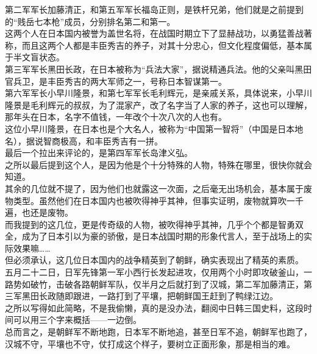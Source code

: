 \begin{multicols}{\theparacolNo}
第二军军长加藤清正，和第五军军长福岛正则，是铁杆兄弟，他们就是之前提到的“贱岳七本枪”成员，分别排名第二和第一。\\

这两个人在日本国内被誉为盖世名将，在战国时期立下了显赫战功，以勇猛善战著称，而且这两个人都是丰臣秀吉的养子，对其十分忠心，但文化程度偏低，基本属于半文盲状态。\\

第三军军长黑田长政，在日本被称为“兵法大家”，据说精通兵法。他的父亲叫黑田官兵卫，是丰臣秀吉的两大军师之一，号称日本智谋第一。\\

第六军军长小早川隆景，和第七军军长毛利辉元，是亲戚关系，具体说来，小早川隆景是毛利辉元的叔叔，为了混家产，改了名字当了人家的养子，这也可以理解，那年头在日本，名字不值钱，一年改个十次八次的人也有。\\

这位小早川隆景，在日本也是个大名人，被称为“中国第一智将”（中国是日本地名），据说智商极高，和丰臣秀吉有一拼。\\

最后一个拉出来评论的，是第四军军长岛津义弘。\\

之所以最后提到这个人，是因为他是个十分特殊的人物，特殊在哪里，很快你就会知道。\\

其余的几位就不提了，因为他们也就露这一次面，之后毫无出场机会，基本属于废物类型。虽然他们在日本国内也被吹得神乎其神，但事实证明，废物就算吹一千遍，也还是废物。\\

而我提到的这几位，更是传奇级的人物，被吹得神乎其神，几乎个个都是智勇双全，成为了日本引以为豪的骄傲，是日本战国时期的形象代言人，至于战场上的实际效果嘛……\\

但必须承认，这几位日本国内的战争精英到了朝鲜，确实表现出了精英的素质。\\

五月二十二日，日军先锋第一军小西行长发起进攻，仅用两个小时即攻破釜山，一路势如破竹，击破各路朝鲜军队，仅半月之后就打到了汉城，第二军加藤清正，第三军黑田长政随即跟进，一路打到了平壤，把朝鲜国王赶到了鸭绿江边。\\

之所以写得如此简略，不是我偷懒，真的是没办法，翻阅中日韩三国史料，这段时间可以用三个字来概括——一边倒。\\

总而言之，是朝鲜军不断地跑，日本军不断地追，甚至日军不追，朝鲜军也跑了，汉城不守，平壤也不守，仗打成这个样子，要树立正面形象，那是相当的难。\\


\end{multicols}
